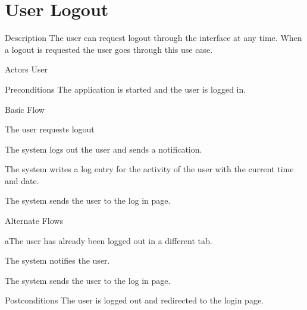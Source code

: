 \section{User Logout}

\begin{cpart}{Description}
The user can request logout through the interface at any time. When a logout is requested the user goes through this use case.
\end{cpart}

\begin{cpart}{Actors}
User
\end{cpart}

\begin{cpart}{Preconditions}
The application is started and the user is logged in.
\end{cpart}

\begin{cpartList}{Basic Flow}
  \item The user requests logout
  \item The system logs out the user and sends a notification.
  \item The system writes a log entry for the activity of the user with the current time and date.
  \item The system sends the user to the log in page.
\end{cpartList}

\begin{cpartList}{Alternate Flows}
  \begin{innerList}{2}{a}{The user has already been logged out in a different tab.}
    \item The system notifies the user.
    \item The system sends the user to the log in page.
  \end{innerList}
\end{cpartList}

\begin{cpart}{Postconditions}
The user is logged out and redirected to the login page.
\end{cpart}

